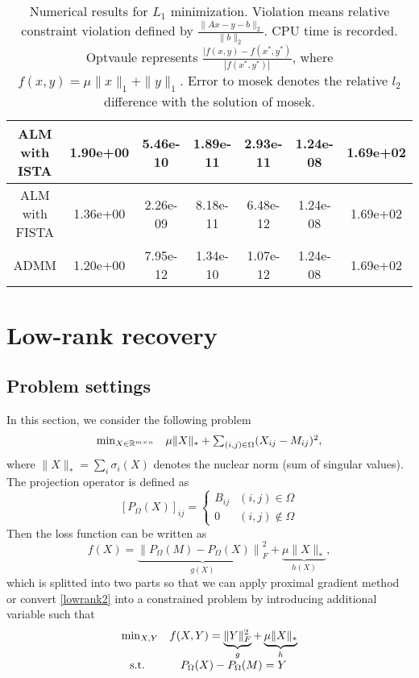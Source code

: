 \documentclass{article}
\begin{document}
\begin{table}[H]
\begin{tabular}{|c|c|c|c|c|c|c|}
 ALM with ISTA & 1.90e+00 & 5.46e-10 & 1.89e-11 & 2.93e-11 &1.24e-08 & 1.69e+02 \\\hline
 ALM with FISTA & 1.36e+00 & 2.26e-09 & 8.18e-11 & 6.48e-12 &1.24e-08 & 1.69e+02 \\\hline
 ADMM & 1.20e+00 & 7.95e-12 & 1.34e-10 & 1.07e-12&1.24e-08 & 1.69e+02  \\\hline
\end{tabular}
\caption{Numerical results for $L_1$ minimization. Violation means relative constraint violation defined by $\frac{\|Ax-y-b\|_2}{\|b\|_2}$. CPU time is recorded. Optvaule represents $\frac{|f(x,y)-f(x^*,y^*)}{|f(x^*,y^*)|}$, where $f(x,y)=\mu\|x\|_1+\|y\|_1$. Error to mosek denotes the relative $l_2$ difference with the solution of mosek.\label{table1}}
\end{table}
\section{Low-rank recovery}
\subsection{Problem settings}
In this section, we consider the following problem
\begin{equation}\label{lowrank}
	\begin{array}{cc}
		\min_{X\in\mathbb R^{m\times n}}& \mu\|X\|_*+\sum_{(i,j)\in\Omega}(X_{ij}-M_{ij})^2,
	\end{array}
\end{equation}
where $\|X\|_*=\sum_{i}\sigma_i(X)$ denotes the nuclear norm (sum of singular values). The projection operator is defined as $$[P_\Omega(X)]_{ij}=\begin{cases}
	B_{ij}&(i,j)\in\Omega \\ 
	0 & (i,j)\notin\Omega 
\end{cases}
$$
Then the loss function can be written as
\begin{equation}\label{lowrank2}
	f(X)=\underbrace{\left\|P_{\Omega}(M)-P_{\Omega}(X)\right\|_{F}^{2}}_{g(X)}+\underbrace{\mu\|X\|_*}_{h(X)},
\end{equation}
which is splitted into two parts so that we can apply proximal gradient method or convert \eqref{lowrank2} into a constrained problem by introducing additional variable such that
\begin{equation}\label{prob4}
	\begin{array}{cc}
		\min_{X,Y}& f(X,Y) = \underbrace{\|Y\|_F^2}_g +\underbrace{\mu\|X\|_*}_h\\
		\text{s.t. } & P_\Omega(X)-P_\Omega(M) = Y
	\end{array}
\end{equation}
\end{document}
